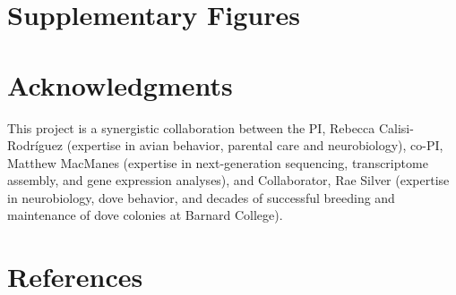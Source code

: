 \documentclass[10pt,letterpaper]{article}
\begin{document}
\hypertarget{supplementary-figures}{%
\section{Supplementary Figures}\label{supplementary-figures}}

\hypertarget{acknowledgments}{%
\section{Acknowledgments}\label{acknowledgments}}

This project is a synergistic collaboration between the PI, Rebecca
Calisi-Rodríguez (expertise in avian behavior, parental care and
neurobiology), co-PI, Matthew MacManes (expertise in next-generation
sequencing, transcriptome assembly, and gene expression analyses), and
Collaborator, Rae Silver (expertise in neurobiology, dove behavior, and
decades of successful breeding and maintenance of dove colonies at
Barnard College).

\hypertarget{references}{%
\section*{References}\label{references}}

\nolinenumbers
\end{document}
